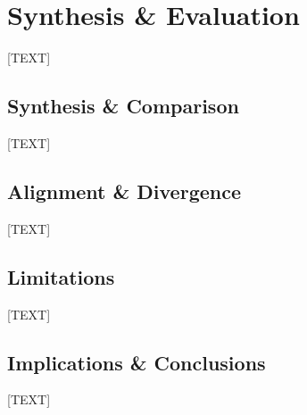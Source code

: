 \documentclass[12pt, openany]{report}
\begin{document}
\chapter{Synthesis \& Evaluation}
[TEXT]
\section{Synthesis \& Comparison}
[TEXT]
\section{Alignment \& Divergence}
[TEXT]
\section{Limitations}
[TEXT]
\section{Implications \& Conclusions}
[TEXT]

\nocite{*}
\printbibliography
\end{document}
